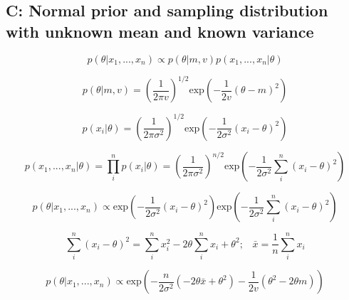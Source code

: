 \documentclass[12pt]{article}
\begin{document}
      \subsection*{C: Normal prior and sampling distribution with unknown mean and known variance}

            \begin{equation}
                  p(\theta|x_1,..., x_n) \propto p(\theta|m,v)p(x_1,...,x_n|\theta)
            \end{equation}

            \begin{equation}
                  p(\theta|m,v) = \left(\frac{1}{2 \pi v} \right )^{1/2} \text{exp}\left( - \frac{1}{2v} (\theta - m)^2\right )
            \end{equation}

            \begin{equation}
                  p(x_i|\theta) = \left(\frac{1}{2 \pi \sigma^2} \right )^{1/2} \text{exp}\left( - \frac{1}{2 \sigma^2} (x_i - \theta)^2\right )
            \end{equation}

            \begin{equation}
                  p(x_1,...,x_n|\theta) = \prod_i^n p(x_i|\theta) = \left(\frac{1}{2 \pi \sigma^2} \right )^{n/2} \text{exp}\left( - \frac{1}{2 \sigma^2} \sum_i^n(x_i - \theta)^2\right )
            \end{equation}

            \begin{equation}
                  p(\theta|x_1,...,x_n) \propto \text{exp}\left( - \frac{1}{2 \sigma^2} (x_i - \theta)^2\right ) \text{exp}\left( - \frac{1}{2 \sigma^2} \sum_i^n(x_i - \theta)^2\right )
            \end{equation}

            \begin{equation}
                  \sum_i^n(x_i - \theta)^2 = \sum_i^n x_i^2 - 2 \theta \sum_i^n x_i + \theta^2; \hspace{10pt} \bar{x} = \frac{1}{n}\sum_i^n x_i
            \end{equation}

            \begin{equation}
                  p(\theta|x_1,...,x_n) \propto \text{exp} \left( - \frac{n}{2 \sigma^2} (-2 \theta \bar{x} + \theta^2) - \frac{1}{2v} (\theta^2 - 2\theta m) \right)
            \end{equation}
\end{document}
